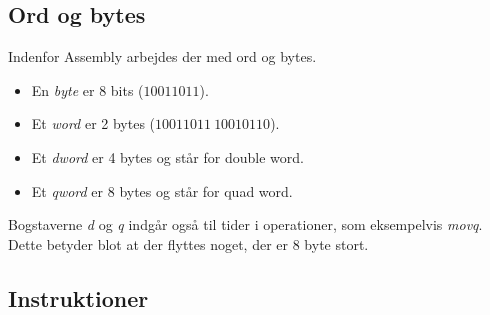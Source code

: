 \subsection{Ord og bytes}
Indenfor Assembly arbejdes der med ord og bytes.
\begin{itemize}
    \item En \textit{byte} er 8 bits ($10011011$).
    \item Et \textit{word} er 2 bytes ($10011011\:10010110$).
    \item Et \textit{dword} er 4 bytes og står for double word.
    \item Et \textit{qword} er 8 bytes og står for quad word.
\end{itemize}
Bogstaverne \textit{d} og \textit{q} indgår også til tider i operationer, som eksempelvis \textit{movq}.
Dette betyder blot at der flyttes noget, der er 8 byte stort.
\subsection{Instruktioner}